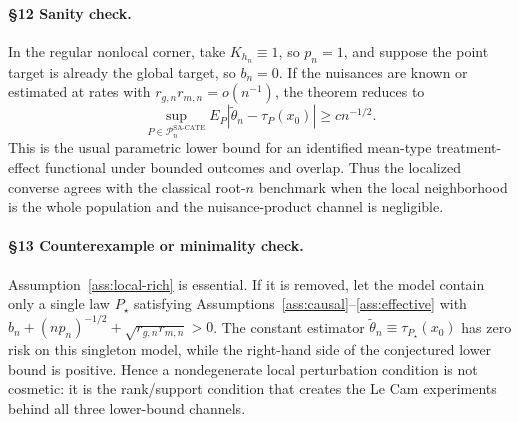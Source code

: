 \paragraph{\S12 Sanity check.}
In the regular nonlocal corner, take $K_{h_n}\equiv1$, so $p_n=1$, and suppose the point target is already the global target, so $b_n=0$.  If the nuisances are known or estimated at rates with $r_{g,n}r_{m,n}=o(n^{-1})$, the theorem reduces to
\[
  \sup_{P\in\mathcal{P}_n^{\mathrm{SA\text{-}CATE}}}
  E_P|\tilde\theta_n-\tau_P(x_0)|\ge c n^{-1/2}.
\]
This is the usual parametric lower bound for an identified mean-type treatment-effect functional under bounded outcomes and overlap.  Thus the localized converse agrees with the classical root-$n$ benchmark when the local neighborhood is the whole population and the nuisance-product channel is negligible.

\paragraph{\S13 Counterexample or minimality check.}
Assumption~\ref{ass:local-rich} is essential.  If it is removed, let the model contain only a single law $P_\star$ satisfying Assumptions~\ref{ass:causal}--\ref{ass:effective} with $b_n+(n p_n)^{-1/2}+\sqrt{r_{g,n}r_{m,n}}>0$.  The constant estimator $\tilde\theta_n\equiv\tau_{P_\star}(x_0)$ has zero risk on this singleton model, while the right-hand side of the conjectured lower bound is positive.  Hence a nondegenerate local perturbation condition is not cosmetic: it is the rank/support condition that creates the Le Cam experiments behind all three lower-bound channels.
